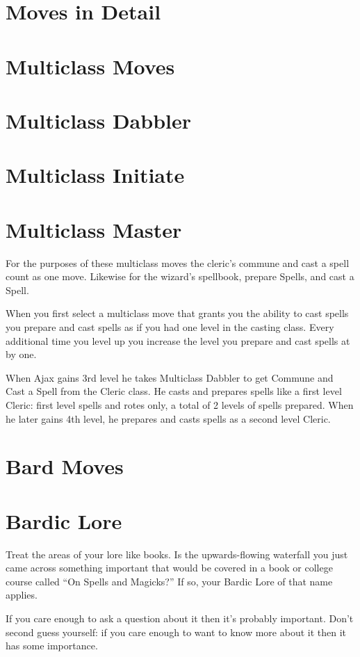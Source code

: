 \section{Moves in Detail}
\section{Multiclass Moves}
\section{Multiclass Dabbler}
\section{Multiclass Initiate}
\section{Multiclass Master}


 For the purposes of these multiclass moves the cleric's commune and cast a spell count as one move. Likewise for the wizard's spellbook, prepare Spells, and cast a Spell.


 When you first select a multiclass move that grants you the ability to cast spells you prepare and cast spells as if you had one level in the casting class. Every additional time you level up you increase the level you prepare and cast spells at by one.


 When Ajax gains 3rd level he takes Multiclass Dabbler to get Commune and Cast a Spell from the Cleric class. He casts and prepares spells like a first level Cleric: first level spells and rotes only, a total of 2 levels of spells prepared. When he later gains 4th level, he prepares and casts spells as a second level Cleric.
\section{Bard Moves}
\section{Bardic Lore}


 Treat the areas of your lore like books. Is the upwards-flowing waterfall you just came across something important that would be covered in a book or college course called ``On Spells and Magicks?'' If so, your Bardic Lore of that name applies.


 If you care enough to ask a question about it then it's probably important. Don't second guess yourself: if you care enough to want to know more about it then it has some importance.
